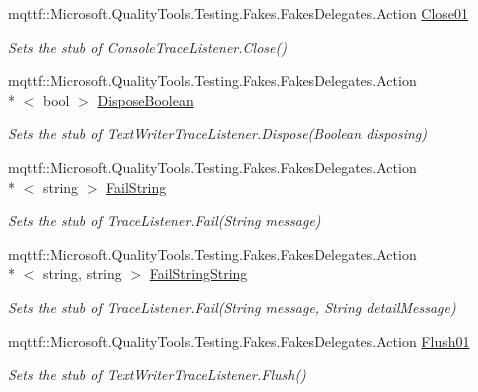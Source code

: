 \begin{DoxyCompactItemize}
\item 
mqttf\-::\-Microsoft.\-Quality\-Tools.\-Testing.\-Fakes.\-Fakes\-Delegates.\-Action \hyperlink{class_system_1_1_diagnostics_1_1_fakes_1_1_stub_console_trace_listener_a73512c0a82ef6fbf4020397fc17c4b9c}{Close01}
\begin{DoxyCompactList}\small\item\em Sets the stub of Console\-Trace\-Listener.\-Close()\end{DoxyCompactList}\item 
mqttf\-::\-Microsoft.\-Quality\-Tools.\-Testing.\-Fakes.\-Fakes\-Delegates.\-Action\\*
$<$ bool $>$ \hyperlink{class_system_1_1_diagnostics_1_1_fakes_1_1_stub_console_trace_listener_aa6155bc4322e877d539f82088349e966}{Dispose\-Boolean}
\begin{DoxyCompactList}\small\item\em Sets the stub of Text\-Writer\-Trace\-Listener.\-Dispose(\-Boolean disposing)\end{DoxyCompactList}\item 
mqttf\-::\-Microsoft.\-Quality\-Tools.\-Testing.\-Fakes.\-Fakes\-Delegates.\-Action\\*
$<$ string $>$ \hyperlink{class_system_1_1_diagnostics_1_1_fakes_1_1_stub_console_trace_listener_ad0e0632b11b0b94aaabc0147343fe1a4}{Fail\-String}
\begin{DoxyCompactList}\small\item\em Sets the stub of Trace\-Listener.\-Fail(\-String message)\end{DoxyCompactList}\item 
mqttf\-::\-Microsoft.\-Quality\-Tools.\-Testing.\-Fakes.\-Fakes\-Delegates.\-Action\\*
$<$ string, string $>$ \hyperlink{class_system_1_1_diagnostics_1_1_fakes_1_1_stub_console_trace_listener_a0e6e35037854a73baf8b3e09fa4912df}{Fail\-String\-String}
\begin{DoxyCompactList}\small\item\em Sets the stub of Trace\-Listener.\-Fail(\-String message, String detail\-Message)\end{DoxyCompactList}\item 
mqttf\-::\-Microsoft.\-Quality\-Tools.\-Testing.\-Fakes.\-Fakes\-Delegates.\-Action \hyperlink{class_system_1_1_diagnostics_1_1_fakes_1_1_stub_console_trace_listener_a42d9c17dec0c1481190261610f1b807a}{Flush01}
\begin{DoxyCompactList}\small\item\em Sets the stub of Text\-Writer\-Trace\-Listener.\-Flush()\end{DoxyCompactList}\item 

\end{DoxyCompactItemize}
